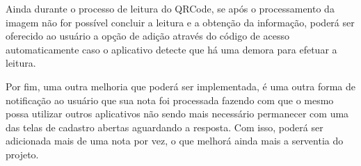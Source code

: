 Ainda durante o processo de leitura do QRCode, se após o processamento da imagem não for possível concluir a leitura e a obtenção da informação, poderá ser oferecido ao usuário a opção de adição através do código de acesso automaticamente caso o aplicativo detecte que há uma demora para efetuar a leitura.

Por fim, uma outra melhoria que poderá ser implementada, é uma outra forma de notificação ao usuário que sua nota foi processada fazendo com que o mesmo possa utilizar outros aplicativos não sendo mais necessário permanecer com uma das telas de cadastro abertas aguardando a resposta. Com isso, poderá ser adicionada mais de uma nota por vez, o que melhorá ainda mais a serventia do projeto.